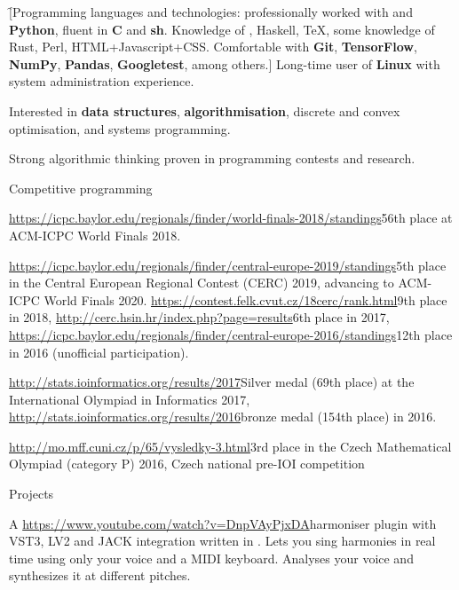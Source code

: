 \f[Programming languages and technologies: professionally worked with {\bf
\Cpp} and {\bf Python}, fluent in {\bf C} and {\bf sh}. Knowledge of \Cis,
Haskell, \TeX, some knowledge of Rust, Perl, HTML+Javascript+CSS. Comfortable
with {\bf Git}, {\bf TensorFlow}, {\bf NumPy}, {\bf Pandas}, {\bf Googletest},
among others.] Long-time user of {\bf Linux} with system administration
experience.


Interested in {\bf data structures}, {\bf algorithmisation}, discrete and convex
optimisation, and systems programming.

Strong algorithmic thinking proven in programming contests and research.

\sekce Competitive programming

\url{https://icpc.baylor.edu/regionals/finder/world-finals-2018/standings}{56th
place} at ACM-ICPC World Finals 2018.

\url{https://icpc.baylor.edu/regionals/finder/central-europe-2019/standings}{5th place} in the Central
European Regional Contest (CERC) 2019, advancing to ACM-ICPC World Finals 2020.
\url{https://contest.felk.cvut.cz/18cerc/rank.html}{9th place} in 2018,
\url{http://cerc.hsin.hr/index.php?page=results}{6th place} in 2017,
\url{https://icpc.baylor.edu/regionals/finder/central-europe-2016/standings}{12th
place} in 2016 (unofficial participation).

\url{http://stats.ioinformatics.org/results/2017}{Silver medal (69th place)} at
the International Olympiad in Informatics 2017,
\url{http://stats.ioinformatics.org/results/2016}{bronze medal (154th place)}
in 2016.

\url{http://mo.mff.cuni.cz/p/65/vysledky-3.html}{3rd place} in the Czech
Mathematical Olympiad (category P) 2016, Czech national pre-IOI competition

\sekce Projects


A \url{https://www.youtube.com/watch?v=DnpVAyPjxDA}{harmoniser} plugin with
VST3, LV2 and JACK integration written in \Cpp. Lets you sing harmonies in
real time using only your voice and a MIDI keyboard. Analyses your voice and
synthesizes it at different pitches.

